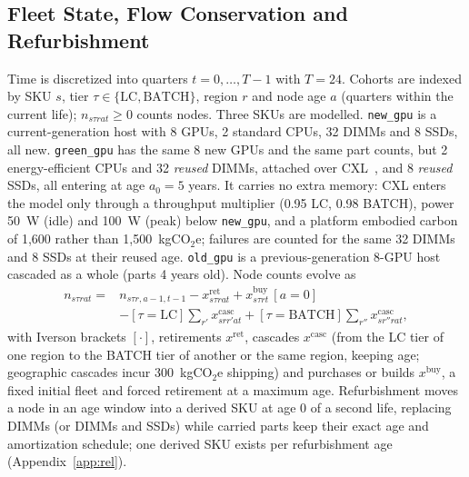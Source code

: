 \documentclass{article} %
\begin{document}
\subsection{Fleet State, Flow Conservation and Refurbishment}
\label{sec:method_state}
\label{sec:method_flow}
Time is discretized into quarters $t = 0,\dots,T-1$ with $T = 24$. Cohorts are indexed by SKU $s$, tier $\tau \in \{\text{LC}, \text{BATCH}\}$, region $r$ and node age $a$ (quarters within the current life); $n_{s\tau r a t} \ge 0$ counts nodes. Three SKUs are modelled. \texttt{new\_gpu} is a current-generation host with 8 GPUs, 2 standard CPUs, 32 DIMMs and 8 SSDs, all new. \texttt{green\_gpu} has the same 8 new GPUs and the same part counts, but 2 energy-efficient CPUs and 32 \emph{reused} DIMMs, attached over CXL~\citep{Sharma2024IntroductionCompute}, and 8 \emph{reused} SSDs, all entering at age $a_0=5$ years. It carries no extra memory: CXL enters the model only through a throughput multiplier (0.95 LC, 0.98 BATCH), power 50~W (idle) and 100~W (peak) below \texttt{new\_gpu}, and a platform embodied carbon of 1,600 rather than 1,500~kgCO$_2$e; failures are counted for the same 32 DIMMs and 8 SSDs at their reused age. \texttt{old\_gpu} is a previous-generation 8-GPU host cascaded as a whole (parts 4 years old). Node counts evolve as
\begin{equation}
\begin{split}
n_{s\tau r a t} = {} & n_{s\tau r,a-1,t-1} - x^{\text{ret}}_{s\tau r a t} + x^{\text{buy}}_{s\tau r t}\,[a=0] \\
& - [\tau=\text{LC}]\textstyle\sum_{r'} x^{\text{casc}}_{s r r' a t} + [\tau=\text{BATCH}]\textstyle\sum_{r''} x^{\text{casc}}_{s r'' r a t},
\end{split}
\label{eq:flow}
\end{equation}
with Iverson brackets $[\cdot]$, retirements $x^{\text{ret}}$, cascades $x^{\text{casc}}$ (from the LC tier of one region to the BATCH tier of another or the same region, keeping age; geographic cascades incur 300~kgCO$_2$e shipping) and purchases or builds $x^{\text{buy}}$, a fixed initial fleet and forced retirement at a maximum age. Refurbishment moves a node in an age window into a derived SKU at age 0 of a second life, replacing DIMMs (or DIMMs and SSDs) while carried parts keep their exact age and amortization schedule; one derived SKU exists per refurbishment age (Appendix~\ref{app:rel}).
\end{document}
